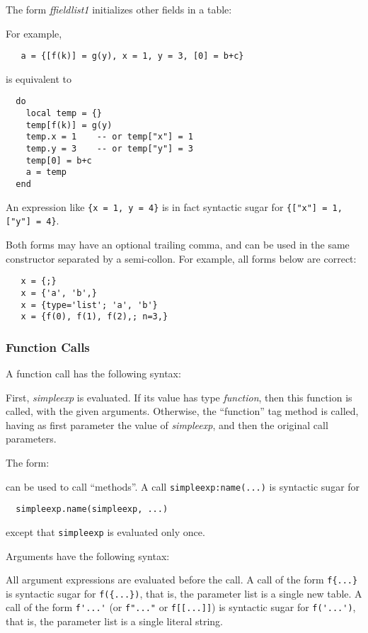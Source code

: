 \documentclass[11pt]{article}
\newcommand{\M}[1]{\emph{#1}}
\newcommand{\Index}[1]{#1\index{#1}}
\begin{document}
The form \emph{ffieldlist1} initializes other fields in a table:
\begin{Produc}
\end{Produc}%
For example,
\begin{verbatim}
   a = {[f(k)] = g(y), x = 1, y = 3, [0] = b+c}
\end{verbatim}
is equivalent to
\begin{verbatim}
  do
    local temp = {}
    temp[f(k)] = g(y)
    temp.x = 1    -- or temp["x"] = 1
    temp.y = 3    -- or temp["y"] = 3
    temp[0] = b+c
    a = temp
  end
\end{verbatim}
An expression like \verb|{x = 1, y = 4}| is
in fact syntactic sugar for \verb|{["x"] = 1, ["y"] = 4}|.

Both forms may have an optional trailing comma,
and can be used in the same constructor separated by
a semi-collon.
For example, all forms below are correct:
\begin{verbatim}
   x = {;}
   x = {'a', 'b',}
   x = {type='list'; 'a', 'b'}
   x = {f(0), f(1), f(2),; n=3,}
\end{verbatim}

\subsubsection{Function Calls}  \label{functioncall}
A \Index{function call} has the following syntax:
\begin{Produc}
\end{Produc}%
First, \M{simpleexp} is evaluated.
If its value has type \emph{function},
then this function is called,
with the given arguments.
Otherwise, the ``function'' tag method is called,
having as first parameter the value of \M{simpleexp},
and then the original call parameters.

The form:
\begin{Produc}
\end{Produc}%
can be used to call ``methods''.
A call \verb|simpleexp:name(...)|
is syntactic sugar for
\begin{verbatim}
  simpleexp.name(simpleexp, ...)
\end{verbatim}
except that \verb|simpleexp| is evaluated only once.

Arguments have the following syntax:
\begin{Produc}
\end{Produc}%
All argument expressions are evaluated before the call.
A call of the form \verb|f{...}| is syntactic sugar for
\verb|f({...})|, that is,
the parameter list is a single new table.
A call of the form \verb|f'...'|
(or \verb|f"..."| or \verb|f[[...]]|) is syntactic sugar for
\verb|f('...')|, that is,
the parameter list is a single literal string.
\end{document}
